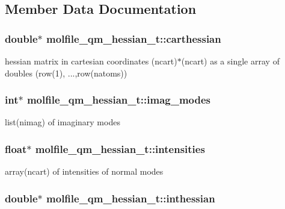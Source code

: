 \subsection{\-Member \-Data \-Documentation}
\hypertarget{structmolfile__qm__hessian__t_af57f036fbd1248dd166681338fe0ad7a}{
\subsubsection[{carthessian}]{\setlength{\rightskip}{0pt plus 5cm}double$\ast$ {\bf molfile\-\_\-qm\-\_\-hessian\-\_\-t\-::carthessian}}}\label{structmolfile__qm__hessian__t_af57f036fbd1248dd166681338fe0ad7a}
hessian matrix in cartesian coordinates (ncart)$\ast$(ncart) as a single array of doubles (row(1), ...,row(natoms)) \hypertarget{structmolfile__qm__hessian__t_aa68c9018c3bc3a8b290de04c35c43727}{
\subsubsection[{imag\-\_\-modes}]{\setlength{\rightskip}{0pt plus 5cm}int$\ast$ {\bf molfile\-\_\-qm\-\_\-hessian\-\_\-t\-::imag\-\_\-modes}}}\label{structmolfile__qm__hessian__t_aa68c9018c3bc3a8b290de04c35c43727}
list(nimag) of imaginary modes \hypertarget{structmolfile__qm__hessian__t_a41dcd0b1fc240696839f36fa5e715a2b}{
\subsubsection[{intensities}]{\setlength{\rightskip}{0pt plus 5cm}float$\ast$ {\bf molfile\-\_\-qm\-\_\-hessian\-\_\-t\-::intensities}}}\label{structmolfile__qm__hessian__t_a41dcd0b1fc240696839f36fa5e715a2b}
array(ncart) of intensities of normal modes \hypertarget{structmolfile__qm__hessian__t_ab6e5942eeed3658b6e0fd43209d4018d}{
\subsubsection[{inthessian}]{\setlength{\rightskip}{0pt plus 5cm}double$\ast$ {\bf molfile\-\_\-qm\-\_\-hessian\-\_\-t\-::inthessian}}}\label{structmolfile__qm__hessian__t_ab6e5942eeed3658b6e0fd43209d4018d}
